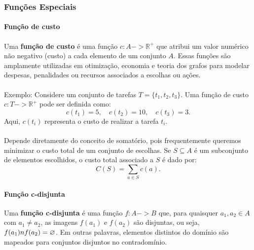 \documentclass[12pt,a4paper]{article}
\def\cap{\string n}%
\def\to{->}%
\begin{document}
\subsubsection{Funções Especiais}

\paragraph{Função de custo}
\paragraph{}Uma \textbf{função de custo} é uma função \(c: A \to \mathbb{R}^+\) que atribui um valor numérico não negativo (custo) a cada elemento de um conjunto \(A\). Essas funções são amplamente utilizadas em otimização, economia e teoria dos grafos para modelar despesas, penalidades ou recursos associados a escolhas ou ações.

\paragraph{}
Exemplo: Considere um conjunto de tarefas \(T = \{t_1, t_2, t_3\}\). Uma função de custo \(c: T \to \mathbb{R}^+\) pode ser definida como:
\[c(t_1) = 5, \quad c(t_2) = 10, \quad c(t_3) = 3.\]
Aqui, \(c(t_i)\) representa o custo de realizar a tarefa \(t_i\). 

\paragraph{}
Depende diretamente do conceito de somatório, pois frequentemente queremos minimizar o custo total de um conjunto de escolhas. Se \(S \subseteq A\) é um subconjunto de elementos escolhidos, o custo total associado a \(S\) é dado por:
\[C(S) = \sum_{a \in S} c(a).\] 

\paragraph{Função c-disjunta}
Uma \textbf{função c-disjunta} é uma função \(f: A \to B\) que, para quaisquer \(a_1, a_2 \in A\) com \(a_1 \neq a_2\), as imagens \(f(a_1)\) e \(f(a_2)\) são disjuntas, ou seja, \(f(a_1) \cap f(a_2) = \varnothing\). Em outras palavras, elementos distintos do domínio são mapeados para conjuntos disjuntos no contradomínio.
\end{document}
